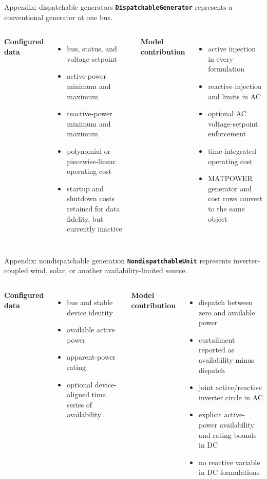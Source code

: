\documentclass[aspectratio=169,11pt]{beamer}
\newcommand{\tightitems}{\setlength{\itemsep}{0.42em}}
\begin{document}
\begin{frame}{Appendix: dispatchable generators}
  \textbf{\texttt{DispatchableGenerator}} represents a conventional generator at one bus.
  \begin{columns}[T,onlytextwidth]
    \textbf{Configured data}
    \begin{itemize}\small\tightitems
      \item bus, status, and voltage setpoint
      \item active-power minimum and maximum
      \item reactive-power minimum and maximum
      \item polynomial or piecewise-linear operating cost
      \item startup and shutdown costs retained for data fidelity, but currently inactive
    \end{itemize}
    \textbf{Model contribution}
    \begin{itemize}\small\tightitems
      \item active injection in every formulation
      \item reactive injection and limits in AC
      \item optional AC voltage-setpoint enforcement
      \item time-integrated operating cost
      \item MATPOWER generator and cost rows convert to the same object
    \end{itemize}
  \end{columns}
\end{frame}

\begin{frame}{Appendix: nondispatchable generation}
  \textbf{\texttt{NondispatchableUnit}} represents inverter-coupled wind, solar, or another availability-limited source.
  \begin{columns}[T,onlytextwidth]
    \textbf{Configured data}
    \begin{itemize}\small\tightitems
      \item bus and stable device identity
      \item available active power
      \item apparent-power rating
      \item optional device-aligned time series of availability
    \end{itemize}
    \textbf{Model contribution}
    \begin{itemize}\small\tightitems
      \item dispatch between zero and available power
      \item curtailment reported as availability minus dispatch
      \item joint active/reactive inverter circle in AC
      \item explicit active-power availability and rating bounds in DC
      \item no reactive variable in DC formulations
    \end{itemize}
  \end{columns}
\end{frame}
\end{document}
